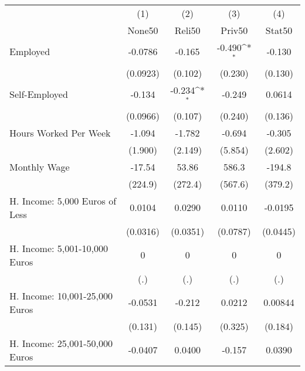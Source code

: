 {
\def\sym#1{\ifmmode^{#1}\else\(^{#1}\)\fi}
\begin{tabular}{l*{4}{c}}
\hline\hline
            &\multicolumn{1}{c}{(1)}&\multicolumn{1}{c}{(2)}&\multicolumn{1}{c}{(3)}&\multicolumn{1}{c}{(4)}\\
            &\multicolumn{1}{c}{None50}&\multicolumn{1}{c}{Reli50}&\multicolumn{1}{c}{Priv50}&\multicolumn{1}{c}{Stat50}\\
\hline
Employed    &     -0.0786         &      -0.165         &      -0.490\sym{*}  &      -0.130         \\
            &    (0.0923)         &     (0.102)         &     (0.230)         &     (0.130)         \\
[1em]
Self-Employed&      -0.134         &      -0.234\sym{*}  &      -0.249         &      0.0614         \\
            &    (0.0966)         &     (0.107)         &     (0.240)         &     (0.136)         \\
[1em]
Hours Worked Per Week&      -1.094         &      -1.782         &      -0.694         &      -0.305         \\
            &     (1.900)         &     (2.149)         &     (5.854)         &     (2.602)         \\
[1em]
Monthly Wage&      -17.54         &       53.86         &       586.3         &      -194.8         \\
            &     (224.9)         &     (272.4)         &     (567.6)         &     (379.2)         \\
[1em]
H. Income: 5,000 Euros of Less&      0.0104         &      0.0290         &      0.0110         &     -0.0195         \\
            &    (0.0316)         &    (0.0351)         &    (0.0787)         &    (0.0445)         \\
[1em]
H. Income: 5,001-10,000 Euros&           0         &           0         &           0         &           0         \\
            &         (.)         &         (.)         &         (.)         &         (.)         \\
[1em]
H. Income: 10,001-25,000 Euros&     -0.0531         &      -0.212         &      0.0212         &     0.00844         \\
            &     (0.131)         &     (0.145)         &     (0.325)         &     (0.184)         \\
[1em]
H. Income: 25,001-50,000 Euros&     -0.0407         &      0.0400         &      -0.157         &      0.0390         \\

\end{tabular}}
